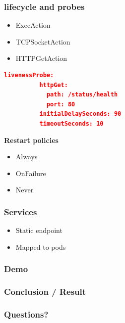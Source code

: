 \documentclass{beamer}
\begin{document}
\begin{frame}[fragile]
\frametitle{lifecycle and probes}
\begin{itemize}
    \item ExecAction
    \item TCPSocketAction
    \item HTTPGetAction
\end{itemize}
    \begin{lstlisting}[language=json,firstnumber=1]
    livenessProbe:
          httpGet:
            path: /status/health
            port: 80
          initialDelaySeconds: 90
          timeoutSeconds: 10
\end{lstlisting}
\textbf{Restart policies}
\begin{itemize}
    \item Always
    \item OnFailure
    \item Never
\end{itemize}
\end{frame}


\begin{frame}
\frametitle{Services}
\begin{itemize}
    \item Static endpoint
    \item Mapped to pods
\end{itemize}
    
\end{frame}


\begin{frame}
\frametitle{Demo}
    
\end{frame}

\begin{frame}
\frametitle{Conclusion / Result}
    
\end{frame}

\begin{frame}
\frametitle{Questions?}
    
\end{frame}
\end{document}

